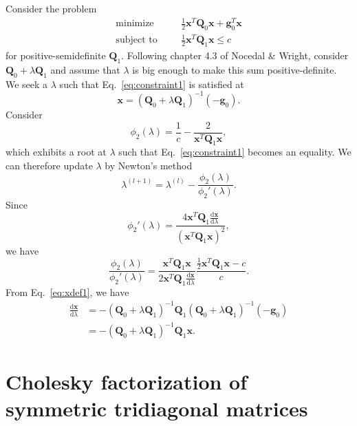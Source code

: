 \documentclass[letterpaper,abstracton]{scrartcl}
\def\eq#1{Eq.~\eqref{eq:#1}}
\newcommand{\ud}{\mathrm{d}}
\newcommand{\bfx}{\mathbf{x}}
\newcommand{\bfg}{\mathbf{g}}
\newcommand{\bfQ}{\mathbf{Q}}
\begin{document}
Consider the problem
\begin{subequations}
  \begin{align}
    \textrm{minimize } &\phantom{=} \frac{1}{2} \bfx^T \bfQ_0 \bfx + \bfg_0^T \bfx \\
    \textrm{subject to } &\phantom{=} \frac{1}{2} \bfx^T \bfQ_1 \bfx \le c \label{eq:constraint1}
  \end{align}
\end{subequations}
for positive-semidefinite $\bfQ_1$.
Following chapter 4.3 of Nocedal \& Wright, consider $\bfQ_0 + \lambda \bfQ_1$ and assume that $\lambda$ is big enough to make this sum positive-definite.
We seek a $\lambda$ such that \eq{constraint1} is satisfied at
\begin{equation}
  \label{eq:xdef1}
  \bfx = (\bfQ_0 + \lambda \bfQ_1)^{-1} (-\bfg_0).
\end{equation}
Consider
\begin{equation}
  \phi_2(\lambda) = \frac{1}{c} - \frac{2}{\bfx^T \bfQ_1 \bfx},
\end{equation}
which exhibits a root at $\lambda$ such that \eq{constraint1} becomes an equality.
We can therefore update $\lambda$ by Newton's method
\begin{equation}
  \lambda^{(l+1)} = \lambda^{(l)} - \frac{\phi_2(\lambda)}{\phi_2'(\lambda)}.
\end{equation}
Since
\begin{equation}
  \phi_2'(\lambda) = \frac{4 \bfx^T \bfQ_1 \frac{\ud \bfx}{\ud \lambda}}{\left(\bfx^T\bfQ_1\bfx\right)^2},
\end{equation}
we have
\begin{equation}
  \frac{\phi_2(\lambda)}{\phi_2'(\lambda)} = \frac{\bfx^T \bfQ_1 \bfx}{2\bfx^T\bfQ_1\frac{\ud \bfx}{\ud \lambda}} \frac{\frac{1}{2}\bfx^T\bfQ_1\bfx - c}{c}.
\end{equation}
From \eq{xdef1}, we have
\begin{align}
  \frac{\ud \bfx}{\ud \lambda} &= - (\bfQ_0+\lambda\bfQ_1)^{-1}\bfQ_1(\bfQ_0+\lambda\bfQ_1)^{-1}(-\bfg_0) \\
  &= - (\bfQ_0+\lambda\bfQ_1)^{-1}\bfQ_1 \bfx.
\end{align}

\section{Cholesky factorization of symmetric tridiagonal matrices}
\end{document}
